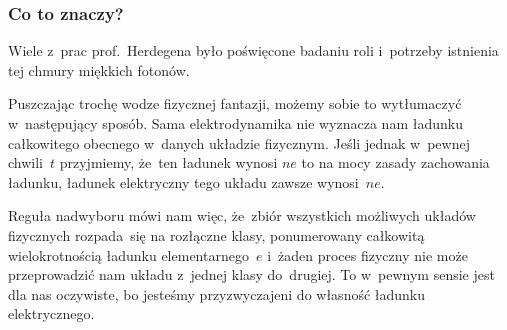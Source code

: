 \documentclass[10pt,t]{beamer}
\begin{document}
\begin{frame}
  \frametitle{Co to znaczy?}


  Wiele z~prac prof.~Herdegena było poświęcone badaniu roli i~potrzeby
  istnienia tej chmury miękkich fotonów.

  Puszczając trochę wodze fizycznej fantazji, możemy sobie to wytłumaczyć
  w~następujący sposób. Sama elektrodynamika nie wyznacza nam ładunku
  całkowitego obecnego w~danych układzie fizycznym. Jeśli jednak w~pewnej
  chwili~$t$ przyjmiemy, że~ten ładunek wynosi $n e$ to na mocy zasady
  zachowania ładunku, ładunek elektryczny tego układu \alert{zawsze}
  wynosi~$n e$.

  Reguła nadwyboru mówi nam więc, że~zbiór wszystkich możliwych układów
  fizycznych rozpada~się na rozłączne klasy, ponumerowany całkowitą
  wielokrotnością ładunku elementarnego~$e$ i~\alert{żaden} proces fizyczny
  nie może przeprowadzić nam układu z~jednej klasy do~drugiej. To w~pewnym
  sensie jest dla nas oczywiste, bo jesteśmy przyzwyczajeni do własność
  ładunku elektrycznego.


\end{frame}
\end{document}
